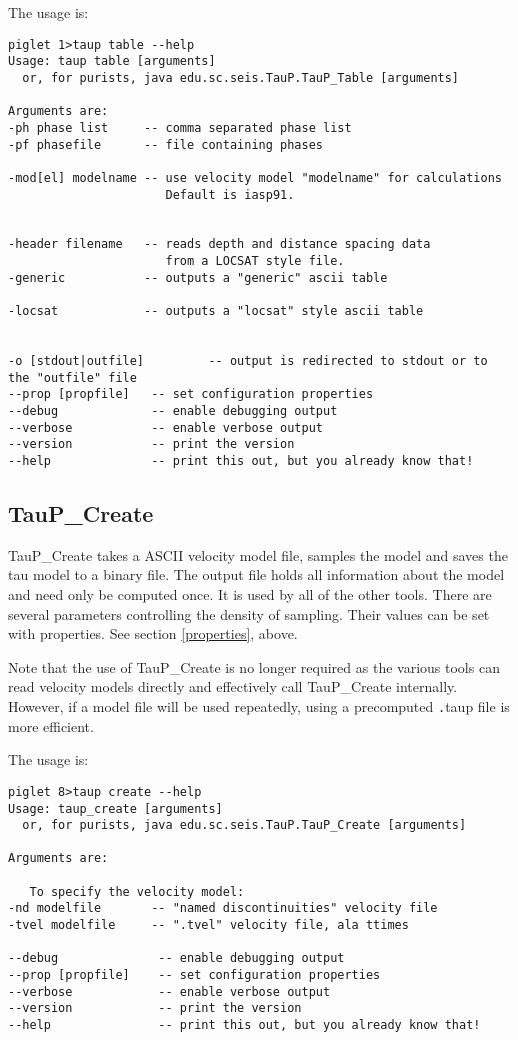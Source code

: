 The usage is:
\begin{verbatim}
piglet 1>taup table --help
Usage: taup table [arguments]
  or, for purists, java edu.sc.seis.TauP.TauP_Table [arguments]

Arguments are:
-ph phase list     -- comma separated phase list
-pf phasefile      -- file containing phases

-mod[el] modelname -- use velocity model "modelname" for calculations
                      Default is iasp91.


-header filename   -- reads depth and distance spacing data
                      from a LOCSAT style file.
-generic           -- outputs a "generic" ascii table

-locsat            -- outputs a "locsat" style ascii table


-o [stdout|outfile]         -- output is redirected to stdout or to the "outfile" file
--prop [propfile]   -- set configuration properties
--debug             -- enable debugging output
--verbose           -- enable verbose output
--version           -- print the version
--help              -- print this out, but you already know that!
\end{verbatim}

\subsection{TauP\_Create}

TauP\_Create takes a ASCII velocity model file, samples the model
 and saves the tau model to a binary file.
The output file holds all
information about the model and need only be computed once. It
is used by all of the other tools. There are several parameters controlling
the density of sampling. Their values can be set with properties. See section
\ref{properties}, above.

Note that the use of TauP\_Create is no longer required as the various tools can read velocity models directly
and effectively call TauP\_Create internally. However, if a model file will be used repeatedly, using a
precomputed {\texttt .taup} file is more efficient.

The usage is:
\begin{verbatim}
piglet 8>taup create --help
Usage: taup_create [arguments]
  or, for purists, java edu.sc.seis.TauP.TauP_Create [arguments]

Arguments are:

   To specify the velocity model:
-nd modelfile       -- "named discontinuities" velocity file
-tvel modelfile     -- ".tvel" velocity file, ala ttimes

--debug              -- enable debugging output
--prop [propfile]    -- set configuration properties
--verbose            -- enable verbose output
--version            -- print the version
--help               -- print this out, but you already know that!
\end{verbatim}

